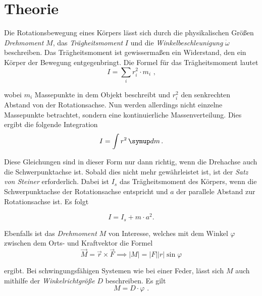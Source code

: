 \section{Theorie}
\label{sec:Theorie}
\setlength{\parindent}{0pt}

Die Rotationsbewegung eines Körpers lässt sich durch die physikalischen Größen \textit{Drehmoment} $M$, das 
\textit{Trägheitsmoment} $I$ und die \textit{Winkelbeschleunigung} $\dot{\omega}$ beschreiben.
Das Trägheitsmoment ist gewissermaßen ein Widerstand, den ein Körper der Bewegung entgegenbringt.
Die Formel für das Trägheitsmoment lautet
\begin{equation*}
    I = \sum_{i} r_{i}^2 \cdot m_{i} \text{ ,}
\end{equation*}

wobei $m_{i}$ Massepunkte in dem Objekt beschreibt und $r_{i}^2$ den senkrechten Abstand von der Rotationsachse.
Nun werden allerdings nicht einzelne Massepunkte betrachtet, sondern eine kontinuierliche Massenverteilung.
Dies ergibt die folgende Integration
\begin{equation}
    I = \int r^2 \dif{m} \text{.}
\end{equation}

Diese Gleichungen sind in dieser Form nur dann richtig, wenn die Drehachse auch die Schwerpunktachse ist.
Sobald dies nicht mehr gewährleistet ist, ist der \textit{Satz von Steiner} erforderlich.
Dabei ist $I_{s}$ das Trägheitsmoment des Körpers, wenn die Schwerpunktachse der Rotationsachse entspricht
und $a$ der parallele Abstand zur Rotationsachse ist. Es folgt

\begin{equation} \label{eq:SatzvSteiner}
    I = I_{s} + m \cdot a^2 \text{.}
\end{equation}

Ebenfalls ist das \textit{Drehmoment} $M$ von Interesse, welches mit dem Winkel $\varphi$ zwischen dem Orts- und Kraftvektor die Formel
\begin{equation} \label{eq:drehmoment}
    \vec{M} = \vec{r} \times \vec{F} \implies \lvert M \rvert = \lvert F \rvert \lvert r \rvert \sin{\varphi}
\end{equation}

ergibt. Bei schwingungsfähigen Systemen wie bei einer Feder, lässt sich $M$ auch mithilfe der \textit{Winkelrichtgröße} $D$ beschreiben.
Es gilt
\begin{equation} \label{eq:drehmomentwinkel}
    M = D \cdot \varphi \text{ .}
\end{equation}

